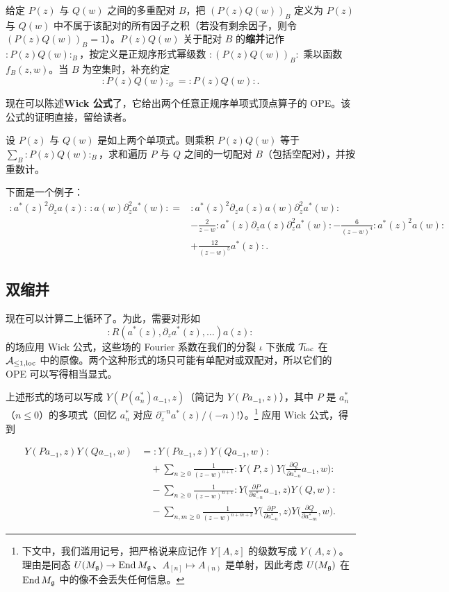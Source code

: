 给定 $P(z)$ 与 $Q(w)$ 之间的多重配对 $B$，把 $(P(z)Q(w))_B$ 定义为 $P(z)$ 与 $Q(w)$ 中不属于该配对的所有因子之积（若没有剩余因子，则令 $(P(z)Q(w))_B = 1$）。$P(z)Q(w)$ 关于配对 $B$ 的\textbf{缩并}记作 ${:}P(z)Q(w){:}_B$，按定义是正规序形式幂级数 ${:}(P(z)Q(w))_B{:}$ 乘以函数 $f_B(z,w)$。当 $B$ 为空集时，补充约定
\[
{:}P(z)Q(w){:}_\varnothing = {:}P(z)Q(w){:}.
\]

现在可以陈述\textbf{Wick 公式}了，它给出两个任意正规序单项式顶点算子的 OPE。该公式的证明直接，留给读者。

\begin{lemma}
设 $P(z)$ 与 $Q(w)$ 是如上两个单项式。则乘积 $P(z)Q(w)$ 等于 $\sum_B {:}P(z)Q(w){:}_B$，求和遍历 $P$ 与 $Q$ 之间的一切配对 $B$（包括空配对），并按重数计。
\end{lemma}

下面是一个例子：
\[
\begin{aligned}
{:}a^*(z)^2\partial_z a(z){:}\,{:}a(w)\partial_z^2 a^*(w){:}
={}&{:}a^*(z)^2\partial_z a(z)a(w)\partial_z^2 a^*(w){:}\\
&-\frac{2}{z-w}{:}a^*(z)\partial_z a(z)\partial_z^2 a^*(w){:}
-\frac{6}{(z-w)^4}{:}a^*(z)^2a(w){:}\\
&+\frac{12}{(z-w)^5}a^*(z){:}.
\end{aligned}
\]

\subsection{双缩并}

现在可以计算二上循环了。为此，需要对形如
\[
{:}R(a^*(z),\partial_z a^*(z),\dots)a(z){:}
\]
的场应用 Wick 公式，这些场的 Fourier 系数在我们的分裂 $\iota$ 下张成 $\mathcal{T}_{\mathrm{loc}}$ 在 $\mathcal{A}_{\le1,\mathrm{loc}}$ 中的原像。两个这种形式的场只可能有单配对或双配对，所以它们的 OPE 可以写得相当显式。

上述形式的场可以写成 $Y(P(a^*_n)a_{-1},z)$（简记为 $Y(Pa_{-1},z)$），其中 $P$ 是 $a^*_n$（$n\le 0$）的多项式（回忆 $a^*_n$ 对应 $\partial_z^{-n}a^*(z)/(-n)!$）。\footnote{下文中，我们滥用记号，把严格说来应记作 $Y[A,z]$ 的级数写成 $Y(A,z)$。理由是同态 $U(M_{\mathfrak{g}})\to\operatorname{End}M_{\mathfrak{g}}$、$A_{[n]}\mapsto A_{(n)}$ 是单射，因此考虑 $U(M_{\mathfrak{g}})$ 在 $\operatorname{End}M_{\mathfrak{g}}$ 中的像不会丢失任何信息。} 应用 Wick 公式，得到

\begin{lemma}
\begin{align*}
Y(Pa_{-1},z)Y(Qa_{-1},w)
&= {:}Y(Pa_{-1},z)Y(Qa_{-1},w){:}\\
&\quad+\sum_{n\ge 0}\frac{1}{(z-w)^{n+1}}{:}Y(P,z)Y\Big(\frac{\partial Q}{\partial a^*_{-n}}a_{-1},w\Big){:}\\
&\quad-\sum_{n\ge 0}\frac{1}{(z-w)^{n+1}}{:}Y\Big(\frac{\partial P}{\partial a^*_{-n}}a_{-1},z\Big)Y(Q,w){:}\\
&\quad-\sum_{n,m\ge 0}\frac{1}{(z-w)^{n+m+2}}Y\Big(\frac{\partial P}{\partial a^*_{-n}},z\Big)Y\Big(\frac{\partial Q}{\partial a^*_{-m}},w\Big).
\end{align*}
\end{lemma}

